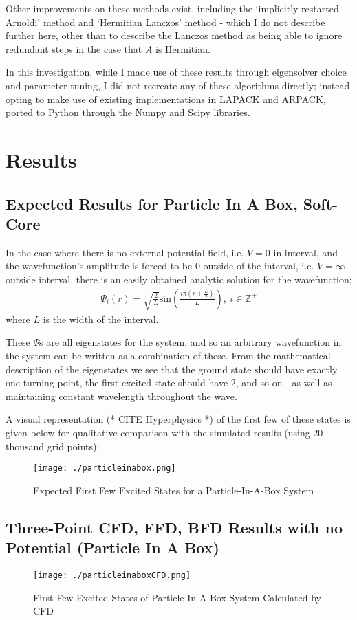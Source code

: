 Other improvements on these methods exist, including the `implicitly restarted Arnoldi' method and `Hermitian Lanczos' method - which I do not describe further here, other than to describe the Lanczos method as being able to ignore redundant steps in the case that $A$ is Hermitian.


In this investigation, while I made use of these results through eigensolver choice and parameter tuning, I did not recreate any of these algorithms directly; instead opting to make use of existing implementations in LAPACK and ARPACK, ported to Python through the Numpy and Scipy libraries.

\section{Results}
\subsection{Expected Results for Particle In A Box, Soft-Core}
In the case where there is no external potential field, i.e. $V=0$ in interval, and the wavefunction's amplitude is forced to be $0$ outside of the interval, i.e. $V=\infty$ outside interval, there is an easily obtained analytic solution for the wavefunction; 
\begin{align*}
	\Psi_{i}\left(r\right) = \sqrt{\frac{2}{L}}\text{sin}\left(\frac{i\pi \left(r + \frac{L}{2}\right)}{L}\right),\ i\in \mathbb{Z}^{+}
\end{align*}
where $L$ is the width of the interval.

These $\Psi$s are all eigenstates for the system, and so an arbitrary wavefunction in the system can be written as a combination of these. From the mathematical description of the eigenstates we see that the ground state should have exactly one turning point, the first excited state should have 2, and so on - as well as maintaining constant wavelength throughout the wave.

A visual representation (* CITE Hyperphysics *) of the first few of these states is given below for qualitative comparison with the simulated results (using 20 thousand grid points);

\begin{figure}[H]
	\texttt{[image: ./particleinabox.png]}
	\centering
	\caption{Expected First Few Excited States for a Particle-In-A-Box System}
\end{figure}

\subsection{Three-Point CFD, FFD, BFD Results with no Potential (Particle In A Box)}
\begin{figure}[H]
	\texttt{[image: ./particleinaboxCFD.png]}
	\centering
	\caption{First Few Excited States of Particle-In-A-Box System Calculated by CFD}
\end{figure}

